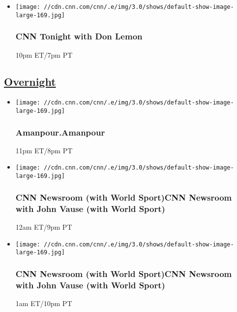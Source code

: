 \begin{itemize}
\item
  \texttt{[image: //cdn.cnn.com/cnn/.e/img/3.0/shows/default-show-image-large-169.jpg]}

  \hypertarget{cnn-tonight-with-don-lemon-3}{%
  \subsubsection{CNN Tonight with Don
  Lemon}\label{cnn-tonight-with-don-lemon-3}}

  10pm ET/7pm PT
\end{itemize}

\hypertarget{overnight--5}{%
\subsection{\texorpdfstring{\href{/tv/schedule/cnn/index.html}{Overnight}~}{Overnight~}}\label{overnight--5}}

\begin{itemize}
\item
  \texttt{[image: //cdn.cnn.com/cnn/.e/img/3.0/shows/default-show-image-large-169.jpg]}

  \hypertarget{amanpouramanpour--10}{%
  \subsubsection{Amanpour.Amanpour }\label{amanpouramanpour--10}}

  11pm ET/8pm PT
\end{itemize}

\begin{itemize}
\item
  \texttt{[image: //cdn.cnn.com/cnn/.e/img/3.0/shows/default-show-image-large-169.jpg]}

  \hypertarget{cnn-newsroom-with-world-sportcnn-newsroom-with-john-vause-with-world-sport--6}{%
  \subsubsection{CNN Newsroom (with World Sport)CNN Newsroom with John
  Vause (with World Sport)
  }\label{cnn-newsroom-with-world-sportcnn-newsroom-with-john-vause-with-world-sport--6}}

  12am ET/9pm PT
\end{itemize}

\begin{itemize}
\item
  \texttt{[image: //cdn.cnn.com/cnn/.e/img/3.0/shows/default-show-image-large-169.jpg]}

  \hypertarget{cnn-newsroom-with-world-sportcnn-newsroom-with-john-vause-with-world-sport--7}{%
  \subsubsection{CNN Newsroom (with World Sport)CNN Newsroom with John
  Vause (with World Sport)
  }\label{cnn-newsroom-with-world-sportcnn-newsroom-with-john-vause-with-world-sport--7}}

  1am ET/10pm PT
\end{itemize}

